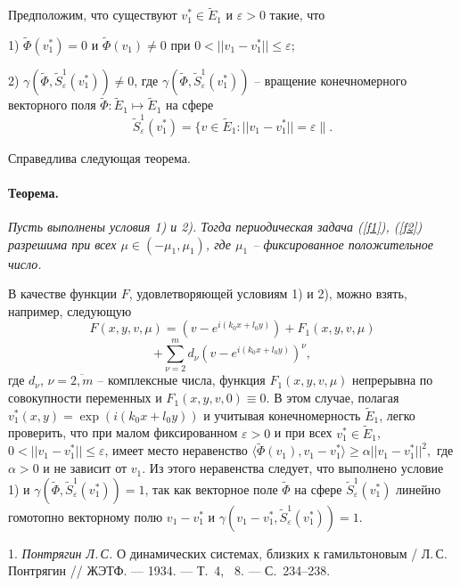 Предположим, что существуют $v_1^*\in \widetilde{E}_1$ и
$\varepsilon>0$ такие, что

1) $\widetilde{\Phi}(v_1^*)=0$ и $\widetilde{\Phi}(v_1)\neq 0$ при
$0<||v_1-v_1^*||\leq\varepsilon$;

2)
$\gamma(\widetilde{\Phi},\widetilde{S}_{\varepsilon}^1(v_1^*))\neq
0$, где
$\gamma(\widetilde{\Phi},\widetilde{S}_{\varepsilon}^1(v_1^*))$ --
вращение конечномерного векторного поля $\widetilde{\Phi} :
\widetilde{E}_1 \mapsto \widetilde{E}_1$ на сфере
$$
 \widetilde{S}_{\varepsilon}^1(v_1^*)= \{v\in \widetilde{E}_1
: ||v_1-v_1^*||=\varepsilon\|.
$$

Справедлива следующая теорема.

\paragraph{Теорема.}
{\it
	Пусть выполнены условия 1) и 2). Тогда  периодическая задача
(\ref{f1}), (\ref{f2}) разрешима при всех $\mu\in (-\mu_1 ,
\mu_1)$, где $\mu_1$ -- фиксированное положительное число.
}

\vspace{0.3 cm}

В качестве функции $F$, удовлетворяющей условиям 1) и 2),
 можно взять, например, следующую
$$
F(x,y,v,\mu)=\left(v-e^{i(k_0x+l_0y)}\right)+ F_1(x,y,v,\mu)
$$
$$
+\sum_{\nu=2}^m
d_{\nu}\left(v-e^{i(k_0x+l_0y)} \right)^{\nu} ,
$$
где $d_{\nu}$, $\nu=\overline{2, m}$ -- комплексные числа, функция
$F_1(x,y,v,\mu)$ непрерывна по совокупности переменных и
$F_1(x,y,v,0)\equiv 0$. В этом случае, полагая
$v_1^*(x,y)=\exp{(i(k_0x+l_0y))}$ и учитывая конечномерность
$\widetilde{E}_1$, легко проверить, что при малом фиксированном
$\varepsilon>0$ и при всех $v_1^*\in \widetilde{E}_1$,
$0<||v_1-v_1^*||\leq\varepsilon$, имеет место неравенство
$
\langle\widetilde{\Phi}(v_1), v_1-v_1^*\rangle  \geq  \alpha
||v_1-v_1^*||^2,
$
где $\alpha>0$ и не зависит от $v_1$. Из этого неравенства
следует, что выполнено условие 1) и
$\gamma(\widetilde{\Phi},\widetilde{S}_{\varepsilon}^1(v_1^*))=1$,
так как  векторное поле $\widetilde{\Phi}$ на сфере
$\widetilde{S}_{\varepsilon}^1(v_1^*)$ линейно гомотопно
векторному полю $v_1-v_1^*$ и
$\gamma(v_1-v_1^*,\widetilde{S}_{\varepsilon}^1(v_1^*))=1$.


\vspace{0.3 cm}


\litlist

1. {\it Понтрягин Л.\,С.}
О динамических системах, близких к гамильтоновым  / Л.\,С.
Понтрягин // ЖЭТФ. --- 1934. --- Т.~4, \No~8. --- С.~234--238.

